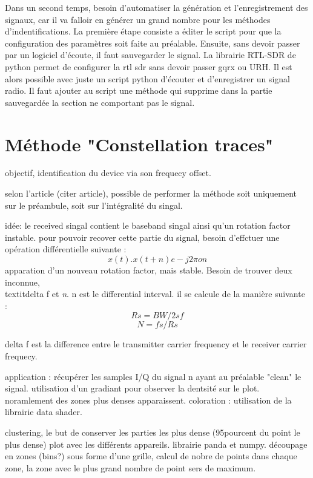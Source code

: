 Dans un second temps, besoin d'automatiser la génération et l'enregistrement des signaux, car il va falloir en générer un grand nombre pour les méthodes d'indentifications. La première étape consiste a éditer le script pour que la configuration des paramètres soit faite au préalable. 
Ensuite, sans devoir passer par un logiciel d'écoute, il faut sauvegarder le signal. La librairie RTL-SDR de python permet de configurer la rtl sdr sans devoir passer gqrx ou URH. Il est alors possible avec juste un script python d'écouter et d'enregistrer un signal radio. 
Il faut ajouter au script une méthode qui supprime dans la partie sauvegardée la section ne comportant pas le signal.


\section{Méthode "Constellation traces"}

objectif, identification du device via son frequecy offset.

selon l'article (citer article), possible de performer la méthode soit uniquement sur le  préambule, soit sur l'intégralité du singal. 

idée: le received singal contient le baseband singal ainsi qu'un rotation factor instable. pour pouvoir recover cette partie du signal, besoin d'effctuer une opération différentielle suivante : $$ x(t) . x(t+n) e -j2\pi on $$
apparation d'un nouveau rotation factor, mais stable. Besoin de trouver deux inconnue, \\textit{delta f} et \textit{n}. n est le differential interval. il se calcule de la manière suivante : $$ Rs = BW / 2sf $$ 
$$ N = fs / Rs $$

delta f est la difference entre le transmitter carrier frequency et le receiver carrier frequecy.

application : récupérer les samples I/Q du signal n ayant au préalable "clean" le signal. utilisation d'un gradiant pour observer la dentsité sur le plot. noramlement des zones plus denses apparaissent.
coloration : utilisation de la librairie data shader. 


clustering, le but de conserver les parties les plus dense (95pourcent du point le plus dense) plot avec les différents appareils.
librairie panda et numpy. découpage en zones (bins?) sous forme d'une grille, calcul de nobre de points dans chaque zone, la zone avec le plus grand nombre de point sers de maximum. 
